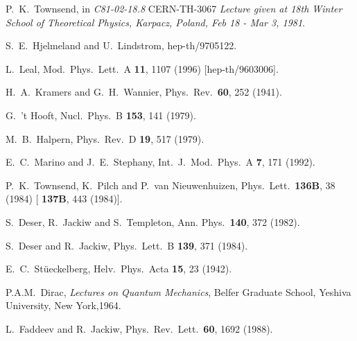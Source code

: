 \documentclass[a4paper,12pt]{article}
\begin{document}
\begin{thebibliography}{25}
P.~K.~Townsend,
in {\it C81-02-18.8}
CERN-TH-3067
{\it Lecture given at 18th Winter School of Theoretical Physics, Karpacz, Poland, Feb 18 - Mar 3, 1981}.

 S.~E.~Hjelmeland and U.~Lindstrom,
hep-th/9705122.

 L.~Leal,
Mod.\ Phys.\ Lett.\ A {\bf 11}, 1107 (1996)
[hep-th/9603006].

H.~A.~Kramers and G.~H.~Wannier,
Phys.\ Rev.\  {\bf 60}, 252 (1941).

 G.~'t Hooft,
Nucl.\ Phys.\ B {\bf 153}, 141 (1979).

M.~B.~Halpern,
Phys.\ Rev.\ D {\bf 19}, 517 (1979).

E.~C.~Marino and J.~E.~Stephany,
Int.\ J.\ Mod.\ Phys.\ A {\bf 7}, 171 (1992).

 P.~K.~Townsend, K.~Pilch and P.~van Nieuwenhuizen,
Phys.\ Lett.\  {\bf 136B}, 38 (1984)
[ {\bf 137B}, 443 (1984)].

 S.~Deser, R.~Jackiw and S.~Templeton,
Ann. Phys.\  {\bf 140}, 372 (1982).

 S.~Deser and R.~Jackiw,
Phys.\ Lett.\ B {\bf 139}, 371 (1984).

E.~C.~St\"ueckelberg,
Helv.\ Phys.\ Acta {\bf 15}, 23 (1942).

P.A.M.~Dirac, {\it Lectures on Quantum Mechanics}, Belfer Graduate
School, Yeshiva University, New York,1964.

 L.~Faddeev and R.~Jackiw,
Phys.\ Rev.\ Lett.\  {\bf 60}, 1692 (1988).


\end{thebibliography}
\end{document}
